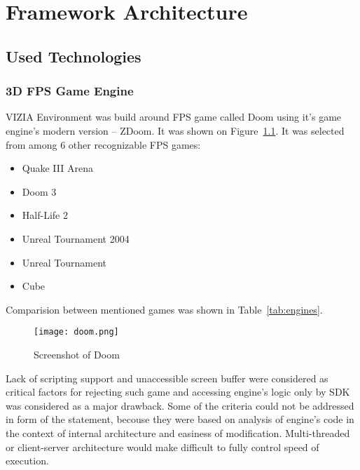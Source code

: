 
\chapter{Framework Architecture}
\label{ch:architecture}
\section{Used Technologies}
\label{sec:technologies}

\subsection{3D FPS Game Engine}


VIZIA Environment was build around FPS game called Doom using it's game engine's modern version -- ZDoom. It was shown on Figure~\ref{fig:doom}. 
It was selected from among 6 other recognizable FPS games: 
\begin{itemize}
\item Quake III Arena 
\item Doom 3
\item Half-Life 2 
\item Unreal Tournament 2004
\item Unreal Tournament
\item Cube
\end{itemize}
Comparision between mentioned games was shown in Table~\ref{tab:engines}.

\begin{figure}
\centering
\texttt{[image: doom.png]}
\caption{Screenshot of Doom}
\label{fig:doom}
\end{figure}



Lack of scripting support and unaccessible screen buffer were considered as critical factors for rejecting such game and accessing engine's logic only by SDK was considered as a major drawback.
Some of the criteria could not be addressed in form of the statement, becouse they were based on analysis of engine's code in the context of internal architecture and easiness of modification.
Multi-threaded or client-server architecture would make difficult to fully control speed of execution. 


